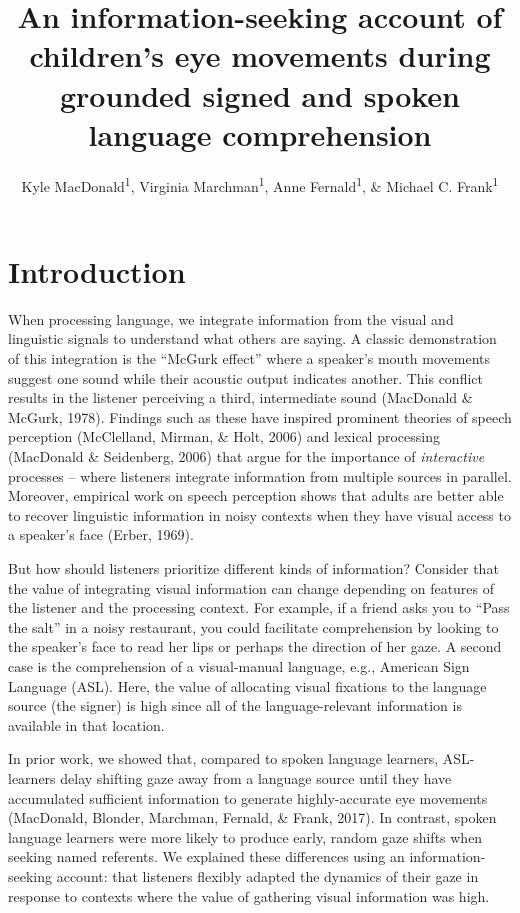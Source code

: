 \documentclass[english,man]{apa6}
\title{An information-seeking account of children's eye movements during
grounded signed and spoken language comprehension}
\author{Kyle MacDonald\textsuperscript{1}, Virginia Marchman\textsuperscript{1}, Anne Fernald\textsuperscript{1}, \& Michael C. Frank\textsuperscript{1}}
\affiliation{
    \vspace{0.5cm}
          \textsuperscript{1} Stanford University  }
\theoremstyle{definition}
\theoremstyle{definition}
\theoremstyle{definition}
\theoremstyle{remark}
\begin{document}
\maketitle

\setcounter{secnumdepth}{0}



\hypertarget{introduction}{%
\section{Introduction}\label{introduction}}

When processing language, we integrate information from the visual and
linguistic signals to understand what others are saying. A classic
demonstration of this integration is the \enquote{McGurk effect} where a
speaker's mouth movements suggest one sound while their acoustic output
indicates another. This conflict results in the listener perceiving a
third, intermediate sound (MacDonald \& McGurk, 1978). Findings such as
these have inspired prominent theories of speech perception (McClelland,
Mirman, \& Holt, 2006) and lexical processing (MacDonald \& Seidenberg,
2006) that argue for the importance of \emph{interactive} processes --
where listeners integrate information from multiple sources in parallel.
Moreover, empirical work on speech perception shows that adults are
better able to recover linguistic information in noisy contexts when
they have visual access to a speaker's face (Erber, 1969).

But how should listeners prioritize different kinds of information?
Consider that the value of integrating visual information can change
depending on features of the listener and the processing context. For
example, if a friend asks you to \enquote{Pass the salt} in a noisy
restaurant, you could facilitate comprehension by looking to the
speaker's face to read her lips or perhaps the direction of her gaze. A
second case is the comprehension of a visual-manual language, e.g.,
American Sign Language (ASL). Here, the value of allocating visual
fixations to the language source (the signer) is high since all of the
language-relevant information is available in that location.

In prior work, we showed that, compared to spoken language learners,
ASL-learners delay shifting gaze away from a language source until they
have accumulated sufficient information to generate highly-accurate eye
movements (MacDonald, Blonder, Marchman, Fernald, \& Frank, 2017). In
contrast, spoken language learners were more likely to produce early,
random gaze shifts when seeking named referents. We explained these
differences using an information-seeking account: that listeners
flexibly adapted the dynamics of their gaze in response to contexts
where the value of gathering visual information was high.
\end{document}
